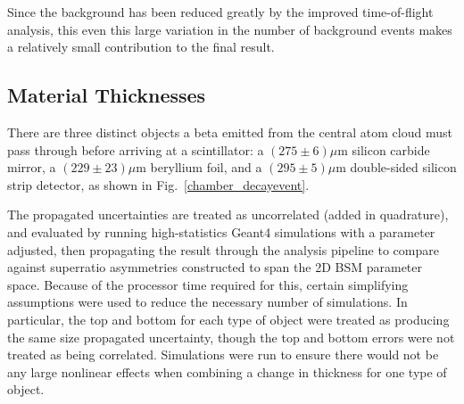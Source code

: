 Since the background has been reduced greatly by the improved time-of-flight
analysis, this even this large variation in the number of background events makes a relatively small contribution to the final result.



\subsection{Material Thicknesses}
There are three distinct objects a beta emitted from the central atom cloud must pass through before arriving at a scintillator:  a $(275 \pm 6) \mu$m silicon carbide mirror, a $(229 \pm 23) \mu$m beryllium foil, and a $(295 \pm 5) \mu$m double-sided silicon strip detector, as shown in Fig.~\ref{chamber_decayevent}.~

The propagated uncertainties are treated as uncorrelated (added in quadrature), and evaluated by running high-statistics Geant4 simulations with a parameter adjusted, then propagating the result through the analysis pipeline to compare against superratio asymmetries constructed to span the 2D BSM parameter space.  Because of the processor time required for this, certain simplifying assumptions were used to reduce the necessary number of simulations.  In particular, the top and bottom for each type of object were treated as producing the same size propagated uncertainty, though the top and bottom errors were not treated as being correlated.  Simulations were run to ensure there would not be any large nonlinear effects when combining a change in thickness for one type of object.  

